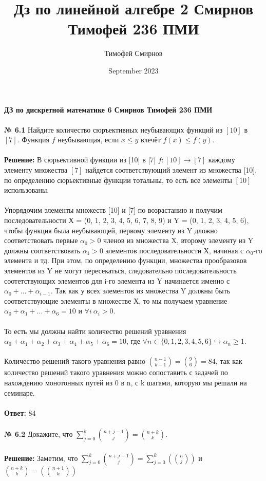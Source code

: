 \documentclass[a4paper, 12pt]{article}
\title{Дз по линейной алгебре 2 Смирнов Тимофей 236 ПМИ}
\author{Тимофей Смирнов}
\date{September 2023}
\begin{document}
    {\center \bf \large ДЗ по дискретной математике 6 Смирнов Тимофей 236 ПМИ}
    \\
    \\ \textbf{№ 6.1} Найдите количество сюръективных неубывающих функций из $[10]$ в $[7]$. Функция $f$ неубывающая,
    если $x \leq y$ влечёт $f(x) \leq f(y)$.
    \\
    \\ \textbf{Решение: } В сюрьективной функции из [10] в [7] $f: [10] \to [7]$ каждому элементу множества $[7]$ найдется соответствующий элемент из множества [10], по определению сюрьективные функции тотальны, то есть все элементы $[10]$ использованы.
    \\
    \\ Упорядочим элементы множеств [10] и [7] по возрастанию и получим последовательности Х = (0, 1, 2, 3, 4, 5, 6, 7, 8, 9) и Y = (0, 1, 2, 3, 4, 5, 6), чтобы функция была неубывающей, первому элементу из Y дложно соответствовать первые 
    $\alpha_0 > 0$ членов из множества X,  второму элементу из Y должны соответствовать $\alpha_1 > 0$ элементов последовательности Х, начиная с $\alpha_0$-го элемента и тд. При этом, по определению функции, множества прообразовов элементов 
    из Y не могут пересекаться, следовательно последовательность соотетствующих элементов для i-го элемента из Y начинается именно с $\alpha_0 + ... + \alpha_{i - 1}$.
    Так как у всех элементов из множества Y должны быть соответствующие элементы в множестве Х, то мы получаем уравнение $\alpha_0 + \alpha_1 + ... + \alpha_6 = 10$ и $\forall i \ \alpha_i > 0$. 
    \\
    \\ То есть мы должны найти количество решений уравнения $\alpha_0 + \alpha_1 + \alpha_2 + \alpha_3 + \alpha_4 + \alpha_5 + \alpha_6 = 10$, где $\forall n \in \{0, 1, 2, 3, 4, 5, 6\} \hookrightarrow \alpha_n \geq 1$.
    \\
    \\ Количество решений такого уравнения равно $\binom{n - 1}{k - 1} = \binom{9}{6} = 84$, так как количество решений такого уравнения можно сопоставить с задачей по нахождению монотонных путей из 0 в n, с k шагами, которую мы решали на семинаре.
    \\
    \\ \textbf{Ответ: } 84
    \\
    \\ \textbf{№ 6.2} Докажите, что $\sum_{j=0}^{k} \binom{n + j - 1}{j} = \binom{n + k}{k}$.
    \\
    \\ \textbf{Решение: } Заметим, что $\sum_{j=0}^{k} \binom{n + j - 1}{j} = \sum_{j=0}^{k} \left(\binom{n}{j}\right)$ и $\binom{n + k}{k} = \left(\binom{n + 1}{k}\right)$ 
\end{document}
